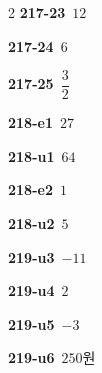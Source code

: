 \documentclass[10pt,a4paper]{article}
\begin{document}
\begin{multicols}{2}
\noindent\textbf{217-23}\ $12$\par
\noindent\textbf{217-24}\ $6$\par
\noindent\textbf{217-25}\ $\dfrac{3}{2}$\par
\noindent\textbf{218-e1}\ $27$\par
\noindent\textbf{218-u1}\ $64$\par
\noindent\textbf{218-e2}\ $1$\par
\noindent\textbf{218-u2}\ $5$\par
\noindent\textbf{219-u3}\ $-11$\par
\noindent\textbf{219-u4}\ $2$\par
\noindent\textbf{219-u5}\ $-3$\par
\noindent\textbf{219-u6}\ $250$원\par
\end{multicols}
\end{document}
